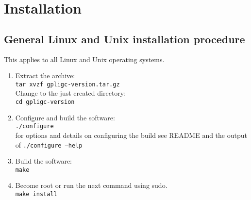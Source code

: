 \section{Installation}

\subsection{General Linux and Unix installation procedure}
\label{unix_install}
\label{linux_install}

This applies to all Linux and Unix operating systems.

\begin{enumerate}

\item Extract the archive: \\
\texttt{tar xvzf gpligc-version.tar.gz} \\
Change to the just created directory: \\
\texttt{cd gpligc-version}

\item Configure and build the software:\\
\texttt{./configure}\\
for options and details on configuring the build see README and the output of \texttt{./configure --help}

\item Build the software:\\
\texttt{make}

\item  \label{root}
Become root or run the next command using sudo.\\
\texttt{make install} %



\end{enumerate}
